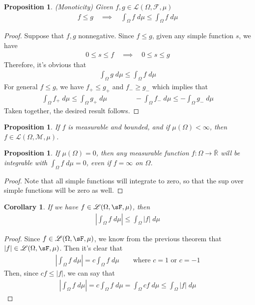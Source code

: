 \documentclass[12pt]{article}
\theoremstyle{plain}
\newtheorem{prop}[thm]{Proposition}
\newtheorem{cor}[thm]{Corollary}
\theoremstyle{definition}
\theoremstyle{remark}
\begin{document}
\begin{prop}\emph{(Monoticity)}
Given $f,g\in\mathscr{L}(\Omega,\mathscr{F},\mu)$
\begin{align*}
  f \leq g
  \quad\implies\quad
  \int_\Omega f \; d\mu \leq \int_\Omega f \; d\mu
\end{align*}
\end{prop}
\begin{proof}
Suppose that $f,g$ nonnegative.
Since $f\leq g$, given any simple function $s$, we have
\begin{align*}
  0\leq s\leq f
  \quad\implies\quad
  0\leq s\leq g
\end{align*}
Therefore, it's obvious that
\begin{align*}
  \int_\Omega g \; d\mu \leq
  \int_\Omega f \; d\mu
\end{align*}
For general $f\leq g$, we have $f_+ \leq g_+$ and $f_- \geq g_-$ which
implies that
\begin{align*}
  \int_\Omega f_+ \; d\mu \leq
  \int_\Omega g_+ \; d\mu
  \qquad\qquad
  -\int_\Omega f_- \; d\mu \leq
  -\int_\Omega g_- \; d\mu
\end{align*}
Taken together, the desired result follows.
\end{proof}


\begin{prop}
If $f$ is measurable and bounded, and if $\mu(\Omega)<\infty$, then
$f\in\mathscr{L}(\Omega,\mathscr{M},\mu)$.
\end{prop}

\begin{prop}
If $\mu(\Omega)=0$, then \emph{any} measurable function $f:
\Omega\rightarrow\bar{\mathbb{R}}$ will be integrable with $\int_\Omega
f \; d\mu=0$, even if $f=\infty$ on $\Omega$.
\end{prop}
\begin{proof}
Note that all simple functions will integrate to zero, so that the sup
over simple functions will be zero as well.
\end{proof}


\begin{cor} If we have $f\in\mathscr{L}(\Omega,\sF,\mu)$, then
\begin{align*}
  \left\lvert \int_\Omega f \; d\mu\right\rvert \leq
  \int_\Omega \left\lvert f \right\rvert \; d\mu
\end{align*}
\end{cor}
\begin{proof}
Since $f\in\mathscr{L}(\Omega,\sF,\mu)$, we know from the previous
theorem that $|f|\in\mathscr{L}(\Omega,\sF,\mu)$. Then it's clear that
\begin{align*}
  \left\lvert \int_\Omega f \; d\mu\right\rvert
  = c \int_\Omega f \; d\mu\qquad\text{where $c=1$ or $c=-1$}
\end{align*}
Then, since $cf\leq |f|$, we can say that
\begin{align*}
  \left\lvert \int_\Omega f \; d\mu\right\rvert
  = c \int_\Omega f \; d\mu
  = \int_\Omega c f \; d\mu \leq
    \int_\Omega |f| \; d\mu
\end{align*}
\end{proof}
\end{document}
